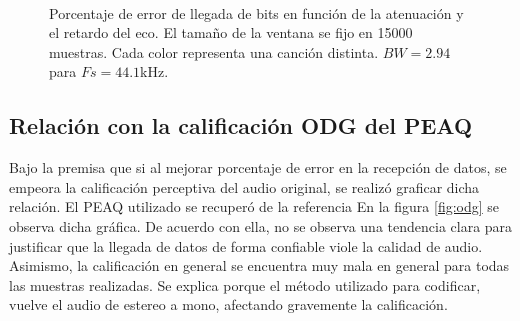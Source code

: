 \documentclass[conference]{IEEEtran}
\begin{document}
\begin{figure}[h]
    \centering
\\
 
  \caption{Porcentaje de error de llegada de bits en función de la atenuación y el retardo del eco. El tamaño de la ventana se fijo en 15000 muestras. Cada color representa una canción distinta. $BW=2.94$ para $Fs=44.1$kHz.}
  \label{fig:15000} 
\end{figure}

\subsection{Relación con la calificación ODG del PEAQ}
Bajo la premisa que si al mejorar porcentaje de error en la recepción de datos, se empeora la calificación perceptiva del audio original, se realizó graficar dicha relación. El PEAQ utilizado se recuperó de la referencia \cite{PEAQ}  En la figura \ref{fig:odg} se observa dicha gráfica. De acuerdo con ella, no se observa una tendencia clara para justificar que la llegada de datos de forma confiable viole la calidad de audio. Asimismo, la calificación en general se encuentra muy mala en general para todas las muestras realizadas. Se explica porque el método utilizado para codificar, vuelve el audio de estereo a mono, afectando gravemente la calificación.
\end{document}
